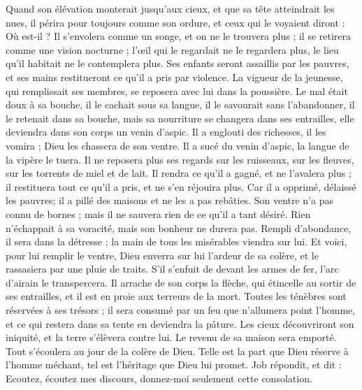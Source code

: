 \begin{multicols}{2}
Quand son élévation monterait jusqu'aux cieux, et que sa tête atteindrait les nues,
il périra pour toujours comme son ordure, et ceux qui le voyaient diront : Où est-il ?
Il s'envolera comme un songe, et on ne le trouvera plus ; il se  retirera comme une vision nocturne ;
l'œil qui le regardait ne le regardera plus, le lieu qu'il habitait ne le contemplera plus.
Ses enfants seront assaillis par les pauvres, et ses mains restitueront ce qu'il a pris par violence.
La vigueur de la jeunesse, qui remplissait ses membres, se reposera avec lui dans la poussière.
Le mal était doux à sa bouche, il le cachait sous sa langue,
il le savourait sans l'abandonner, il le retenait dans sa bouche,
mais sa nourriture se changera dans ses entrailles, elle deviendra dans son corps un venin d'aspic.
Il a englouti des richesses, il les vomira ; Dieu les chassera de son ventre.
Il a sucé du venin d'aspic, la langue de la vipère le tuera.
Il ne reposera plus ses regards sur les ruisseaux, sur les fleuves, sur les torrents de miel et de lait.
Il rendra ce qu'il a gagné, et ne l'avalera plus ; il restituera tout ce qu'il a pris, et ne s'en réjouira plus.
Car il a opprimé, délaissé les pauvres; il a pillé des maisons et ne les a pas rebâties.
Son ventre n'a pas connu de bornes ; mais il ne sauvera rien de ce qu'il a tant désiré.
Rien n'échappait à sa voracité, mais son bonheur ne durera pas.
Rempli d'abondance, il sera dans la détresse ; la main de tous les misérables viendra sur lui.
Et voici, pour lui remplir le ventre, Dieu enverra sur lui l'ardeur de sa colère, et le rassasiera par une pluie de traits.
S’il s’enfuit de devant les armes de fer, l’arc d’airain le transpercera.
Il arrache de son corps la flèche, qui étincelle au sortir de ses entrailles, et il est en proie aux terreurs de la mort.
Toutes les ténèbres sont réservées à ses trésors ; il sera consumé par un feu que n'allumera point l'homme, et ce qui restera dans sa tente en deviendra la pâture.
Les cieux découvriront son iniquité, et la terre s'élèvera contre lui.
Le revenu de sa maison sera emporté. Tout s'écoulera au jour de la colère de Dieu.
Telle est la part que Dieu réserve à l'homme méchant, tel est l'héritage que Dieu lui promet.
\VerseOne{}Job répondit, et dit :
Ecoutez, écoutez mes discours, donnez-moi seulement cette consolation.

\end{multicols}
